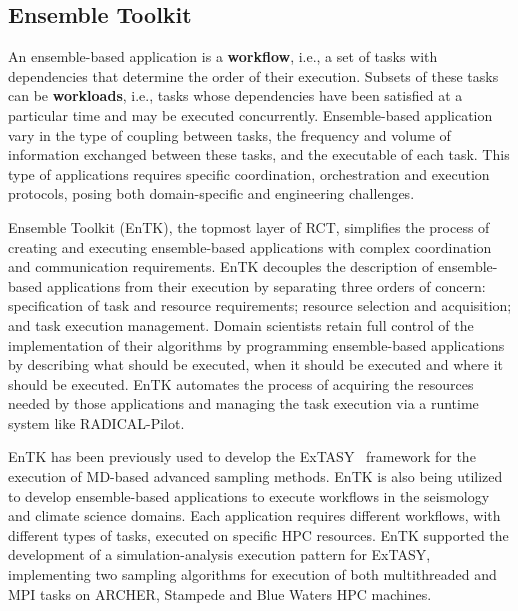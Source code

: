 \subsection{Ensemble Toolkit}

An ensemble-based application is a \textbf{workflow}, i.e., a set of tasks
with dependencies that determine the order of their execution. Subsets of
these tasks can be \textbf{workloads}, i.e., tasks whose dependencies have
been satisfied at a particular time and may be executed concurrently.
Ensemble-based application vary in the type of coupling between tasks, the
frequency and volume of information exchanged between these tasks, and the
executable of each task. This type of applications requires specific
coordination, orchestration and execution protocols, posing both
domain-specific and engineering challenges.

Ensemble Toolkit (EnTK), the topmost layer of RCT, simplifies the process of
creating and executing ensemble-based applications with complex coordination
and communication requirements. EnTK decouples the description of
ensemble-based applications from their execution by separating three orders
of concern: specification of task and resource requirements; resource
selection and acquisition; and task execution management. Domain scientists
retain full control of the implementation of their algorithms by programming
ensemble-based applications by describing what should be executed, when it
should be executed and where it should be executed. EnTK automates the
process of acquiring the resources needed by those applications and managing
the task execution via a runtime system like RADICAL-Pilot.


EnTK has been previously used to develop the
ExTASY~\cite{balasubramanian2016extasy} framework for the execution of
MD-based advanced sampling methods. EnTK is also being utilized to develop
ensemble-based applications to execute workflows in the seismology and
climate science domains. Each application requires different workflows, with
different types of tasks, executed on specific HPC resources. EnTK supported
the development of a simulation-analysis execution pattern for ExTASY,
implementing two sampling algorithms for execution of both multithreaded and
MPI tasks on ARCHER, Stampede and Blue Waters HPC machines. 


